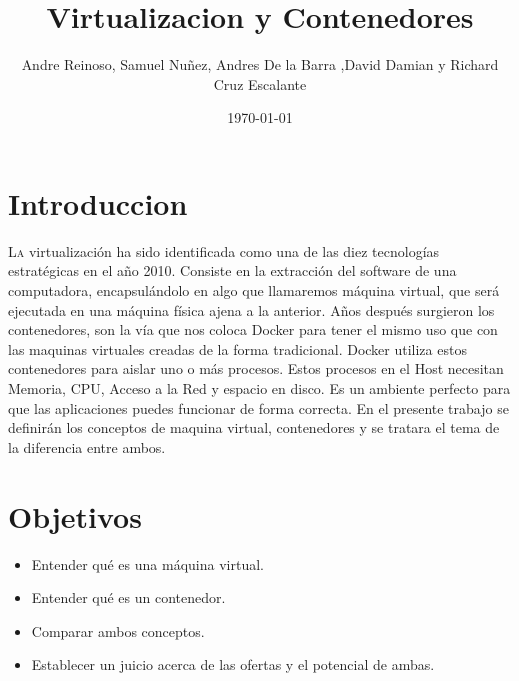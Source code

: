 \documentclass[twoside,twocolumn]{article}
\title{Virtualizacion y Contenedores} %
\author{Andre Reinoso, Samuel Nuñez, Andres De la Barra ,David Damian y Richard Cruz Escalante}
\date{\today} %
\begin{document}
\maketitle


\section{Introduccion}

\lettrine[nindent=0em,lines=3]{L}a virtualización ha sido identificada como una de las diez tecnologías estratégicas en el año 2010. Consiste en la extracción del software de una computadora, encapsulándolo en algo que llamaremos máquina virtual, que será ejecutada en una máquina física ajena a la anterior.
Años después surgieron los contenedores, son la vía que nos coloca Docker para tener el mismo uso que con las maquinas virtuales creadas de la forma tradicional. Docker utiliza estos contenedores para aislar uno o más procesos. Estos procesos en el Host necesitan Memoria, CPU, Acceso a la Red y espacio en disco. Es un ambiente perfecto para que las aplicaciones puedes funcionar de forma correcta.
En el presente trabajo se definirán los conceptos de maquina virtual, contenedores y se tratara el tema de la diferencia entre ambos.




\section{Objetivos}

\begin{itemize}
\item Entender qué es una máquina virtual.
\item Entender qué es un contenedor.
\item Comparar ambos conceptos.
\item Establecer un juicio acerca de las ofertas y el potencial de ambas.

\end{itemize}




\end{document}
